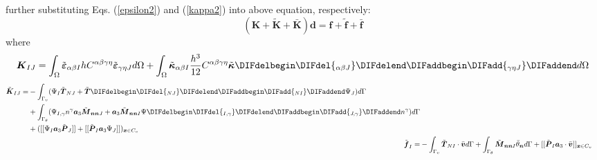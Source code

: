 \DIFdelbegin {}\DIFdelend \DIFaddbegin {}\DIFaddend further substituting Eqs. (\ref{epsilon2}) and (\ref{kappa2}) into above equation\DIFdelbegin {}\DIFdelend , respectively: 
\begin{equation}
        (\boldsymbol K + \tilde{\boldsymbol K} + \bar{\boldsymbol K} )\boldsymbol d = \boldsymbol f + \tilde{\boldsymbol f} + \bar{\boldsymbol f}
\end{equation}
where \DIFaddbegin {}\DIFaddend \begin{equation}\label{de1}
        \boldsymbol K_{IJ} = \int_\Omega \tilde{\boldsymbol \varepsilon}_{\alpha\beta I} hC^{\alpha\beta\gamma\eta}\tilde{\boldsymbol \varepsilon}_{\gamma\eta J} d\Omega + \int_\Omega \tilde{\boldsymbol \kappa}_{\alpha\beta I} \frac{h^3}{12}C^{\alpha\beta\gamma\eta} \tilde{\boldsymbol \kappa}\DIFdelbegin \DIFdel{_{\alpha\beta J} }\DIFdelend \DIFaddbegin \DIFadd{_{\gamma\eta J} }\DIFaddend d\Omega
\end{equation}
\begin{subequations}\label{de2}
\begin{align}
\begin{split}
        \tilde{\boldsymbol K}_{IJ} = &- \int_{\Gamma_v} (\Psi_I \tilde{\boldsymbol T}_{NJ} + \tilde{\boldsymbol T}\DIFdelbegin \DIFdel{_{NJ} }\DIFdelend \DIFaddbegin \DIFadd{_{NI} }\DIFaddend \Psi_J) d\Gamma \\
                                     &+ \int_{\Gamma_\theta} (\Psi_{I,\gamma} n^\gamma \boldsymbol a_3 \tilde{\boldsymbol M}_{\boldsymbol{nn}J} + \boldsymbol a_3 \tilde{\boldsymbol M}_{\boldsymbol{nn}I} \Psi\DIFdelbegin \DIFdel{_{I,\gamma}}\DIFdelend \DIFaddbegin \DIFadd{_{J,\gamma}}\DIFaddend n^\gamma)d\Gamma \\
                                     & + ([[\Psi_I \boldsymbol a_3 \tilde{\boldsymbol P}_J]] + [[\tilde{\boldsymbol P}_I \boldsymbol a_3 \Psi_J]])_{\boldsymbol x \in C_v}
\end{split} \\
\tilde{\boldsymbol f}_I = &- \int_{\Gamma_v} \tilde{\boldsymbol T}_{NI} \cdot \bar{\boldsymbol v} d\Gamma + \int_{\Gamma_\theta} \tilde{\boldsymbol M}_{\boldsymbol{nn}I} \bar{\theta}_{\boldsymbol n} d\Gamma + [[\tilde{\boldsymbol P}_I\boldsymbol a_3 \cdot \bar{\boldsymbol v}]]_{\boldsymbol x \in C_v}
\end{align}
\end{subequations}
